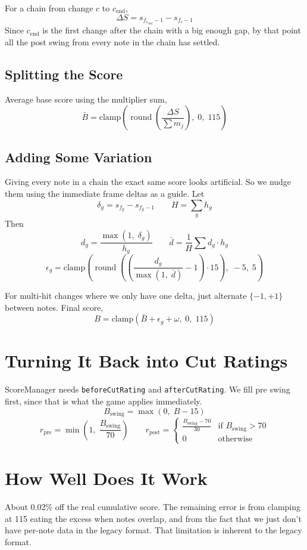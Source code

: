 \documentclass[11pt]{article}
\begin{document}
   For a chain from change $c$ to $c_{\text{end}}$,
   \[
      \Delta S = s_{f_{c_{\text{end}}} - 1}- s_{f_c - 1}
   \]
   Since $c_{\text{end}}$ is the first change after the chain with a big enough
   gap, by that point all the post swing from every note in the chain has settled.

   \subsection{Splitting the Score}

   Average base score using the multiplier sum,
   \[
      \bar{B}= \text{clamp}\!\left(\operatorname{round}\!\left(\frac{\Delta S}{\sum
      m_{j}}\right),\; 0,\; 115\right)
   \]

   \subsection{Adding Some Variation}

   Giving every note in a chain the exact same score looks artificial. So we
   nudge them using the immediate frame deltas as a guide. Let
   \[
      \delta_{g} = s_{f_g}- s_{f_g - 1}\qquad H = \sum_{g} h_{g}
   \]
   Then
   \[
      d_{g} = \frac{\max(1,\; \delta_{g})}{h_{g}}\qquad \bar{d}= \frac{1}{H}\sum d
      _{g} \cdot h_{g}
   \]
   \[
      \epsilon_{g} = \text{clamp}\!\left(\operatorname{round}\!\left(\left(\frac{d_{g}}{\max(1,\;
      \bar{d})}- 1\right) \cdot 15\right),\; -5,\; 5\right)
   \]

   For multi-hit changes where we only have one delta, just alternate $\{-1, +1\}$
   between notes. Final score,
   \[
      B = \text{clamp}\!\left(\bar{B}+ \epsilon_{g} + \omega,\; 0,\; 115\right)
   \]

   \section{Turning It Back into Cut Ratings}

   ScoreManager needs \texttt{beforeCutRating} and \texttt{afterCutRating}. We
   fill pre swing first, since that is what the game applies immediately.
   \[
      B_{\text{swing}}= \max(0,\; B - 15)
   \]
   \[
      r_{\text{pre}}= \min\!\left(1,\; \frac{B_{\text{swing}}}{70}\right) \qquad r
      _{\text{post}}=
      \begin{cases}
         \frac{B_{\text{swing}} - 70}{30} & \text{if }B_{\text{swing}}> 70 \\
         0                                & \text{otherwise}
      \end{cases}
   \]

   \section{How Well Does It Work}

   About 0.02\% off the real cumulative score. The remaining error is from
   clamping at 115 eating the excess when notes overlap, and from the fact that we
   just don't have per-note data in the legacy format. That limitation is
   inherent to the legacy format.
\end{document}

